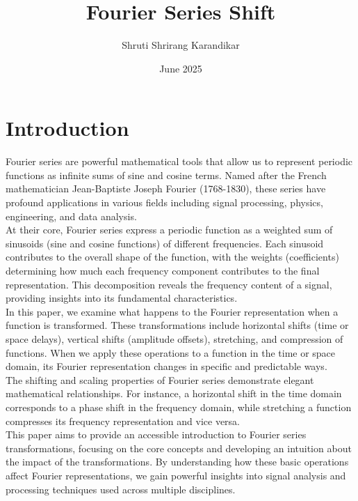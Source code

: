 \documentclass{article}
\title{Fourier Series Shift}
\author{Shruti Shrirang Karandikar}
\date{June 2025}
\begin{document}
\maketitle

\section{Introduction}

Fourier series are powerful mathematical tools that allow us to represent periodic functions as infinite sums of sine and cosine terms. Named after the French mathematician Jean-Baptiste Joseph Fourier (1768-1830), these series have profound applications in various fields including signal processing, physics, engineering, and data analysis.\\

At their core, Fourier series express a periodic function as a weighted sum of sinusoids (sine and cosine functions) of different frequencies. Each sinusoid contributes to the overall shape of the function, with the weights (coefficients) determining how much each frequency component contributes to the final representation. This decomposition reveals the frequency content of a signal, providing insights into its fundamental characteristics.\\

In this paper, we examine what happens to the Fourier representation when a function is transformed. These transformations include horizontal shifts (time or space delays), vertical shifts (amplitude offsets), stretching, and compression of functions. When we apply these operations to a function in the time or space domain, its Fourier representation changes in specific and predictable ways.\\

The shifting and scaling properties of Fourier series demonstrate elegant mathematical relationships. For instance, a horizontal shift in the time domain corresponds to a phase shift in the frequency domain, while stretching a function compresses its frequency representation and vice versa.\\
This paper aims to provide an accessible introduction to Fourier series transformations, focusing on the core concepts and developing an intuition about the impact of the transformations. By understanding how these basic operations affect Fourier representations, we gain powerful insights into signal analysis and processing techniques used across multiple disciplines.\\
\end{document}
